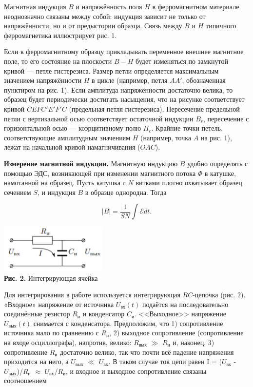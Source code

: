 \documentclass{article}
\begin{document}
Магнитная индукция $ B $ и напряжённость поля $ H $ в ферромагнитном материале неоднозначно связаны между собой: индукция зависит не только от напряжённости, но и от предыстории образца. Связь между $ B $ и $ H $ типичного ферромагнетика иллюстрирует рис. 1.

Если к ферромагнитному образцу прикладывать переменное внешнее магнитное поле, то его состояние на плоскости $ B-H $ будет изменяться по замкнутой кривой — петле гистерезиса. Размер петли определяется максимальным значением напряжённости $ H $ в цикле (например, петля $ AA' $, обозначенная пунктиром на рис. 1). Если амплитуда напряжённости достаточно велика, то образец будет периодически достигать насыщения, что на рисунке соответствует кривой $ CEFC'E'F'C $ (предельная петля гистерезиса). Пересечение предельной петли с вертикальной осью соответствует остаточной индукции $B_r$, пересечение с горизонтальной осью — коэрцитивному полю $H_c$. Крайние точки петель, соответствующие амплитудным значениям $ H $ (например, точка $ A $ на рис. 1), лежат на начальной кривой намагничивания ($ OAC $).

\textbf{Измерение магнитной индукции.} Магнитную индукцию $ B $ удобно определять с помощью ЭДС, возникающей при изменении магнитного потока $ \Phi $ в катушке, намотанной на образец. Пусть катушка c $ N $ витками плотно охватывает образец сечением $ S $, и индукция $ B $ в образце однородна. Тогда

\begin{equation}
    |B|=\frac{1}{SN}\int\mathcal{E} dt.
\end{equation}

\begin{center}
    \includegraphics[width=0.4\textwidth]{int.png} \\
    \textbf{Рис. 2.} Интегрирующая ячейка
\end{center}

Для интегрирования в работе используется интегрирующая $ RC $-цепочка (рис. 2). «Входное» напряжение от источника $U_{\text{вх}}(t)$ подаётся на последовательно соединённые резистор $R_\text{и}$ и конденсатор $C_\text{и}$. <<Выходное>> напряжение $U_{\text{вых}}(t)$ снимается с конденсатора. Предположим, что 1) сопротивление источника мало по сравнению с $R_\text{и}$, 2) выходное сопротивление (сопротивление на входе осциллографа), напротив, велико: $R_{\text{вых}}$ $ \gg $ $R_\text{и}$ и, наконец, 3) сопротивление $R_\text{и}$ достаточно велико, так что почти всё падение напряжения приходится на него, а $U_{\text{вых}}$ $\ll$ $U_{\text{вх}}$. В таком случае ток цепи равен I = ($U_{\text{вх}}$ - $U_{\text{вых}}$)/$R_\text{и}$ $\approx$ $U_{\text{вх}}$/$R_\text{и}$, и входное и выходное сопротивление связаны соотношением
\end{document}
